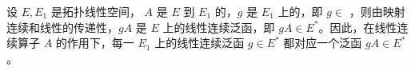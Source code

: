 

设 $E,E_1$ 是拓扑线性空间， $A$ 是 $E$ 到 $E_1$ 的，$g$ 是 $E_1$ 上的，即 $g\in$ ，则由映射连续和线性的传递性，$gA$ 是 $E$ 上的线性连续泛函，即 $gA\in E^*$。因此，在线性连续算子 $A$ 的作用下，每一 $E_1$ 上的线性连续泛函 $g\in E^*$ 都对应一个泛函 $gA\in E^*$。



